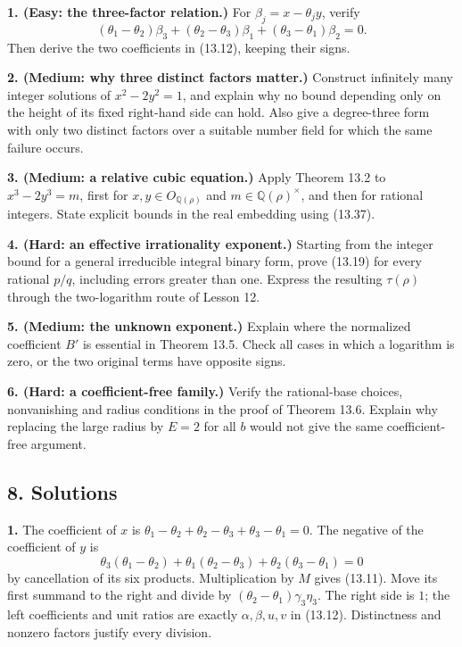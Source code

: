 \documentclass[
  11pt,
  a4paper,
]{article}
\begin{document}
\textbf{1. (Easy: the three-factor relation.)} For
\(\beta_j=x-\theta_jy\), verify \[
(\theta_1-\theta_2)\beta_3+
(\theta_2-\theta_3)\beta_1+
(\theta_3-\theta_1)\beta_2=0.
\] Then derive the two coefficients in (13.12), keeping their signs.

\textbf{2. (Medium: why three distinct factors matter.)} Construct
infinitely many integer solutions of \(x^2-2y^2=1\), and explain why no
bound depending only on the height of its fixed right-hand side can
hold. Also give a degree-three form with only two distinct factors over
a suitable number field for which the same failure occurs.

\textbf{3. (Medium: a relative cubic equation.)} Apply Theorem 13.2 to
\(x^3-2y^3=m\), first for \(x,y\in O_{\mathbb Q(\rho)}\) and
\(m\in\mathbb Q(\rho)^\times\), and then for rational integers. State
explicit bounds in the real embedding using (13.37).

\textbf{4. (Hard: an effective irrationality exponent.)} Starting from
the integer bound for a general irreducible integral binary form, prove
(13.19) for every rational \(p/q\), including errors greater than one.
Express the resulting \(\tau(\rho)\) through the two-logarithm route of
Lesson 12.

\textbf{5. (Medium: the unknown exponent.)} Explain where the normalized
coefficient \(B'\) is essential in Theorem 13.5. Check all cases in
which a logarithm is zero, or the two original terms have opposite
signs.

\textbf{6. (Hard: a coefficient-free family.)} Verify the rational-base
choices, nonvanishing and radius conditions in the proof of Theorem
13.6. Explain why replacing the large radius by \(E=2\) for all \(b\)
would not give the same coefficient-free argument.

\subsection{8. Solutions}\label{solutions}

\textbf{1.} The coefficient of \(x\) is
\(\theta_1-\theta_2+\theta_2-\theta_3+\theta_3-\theta_1=0\). The
negative of the coefficient of \(y\) is \[
\theta_3(\theta_1-\theta_2)+
\theta_1(\theta_2-\theta_3)+
\theta_2(\theta_3-\theta_1)=0
\] by cancellation of its six products. Multiplication by \(M\) gives
(13.11). Move its first summand to the right and divide by
\((\theta_2-\theta_1)\gamma_3\eta_3\). The right side is \(1\); the left
coefficients and unit ratios are exactly \(\alpha,\beta,u,v\) in
(13.12). Distinctness and nonzero factors justify every division.
\end{document}
